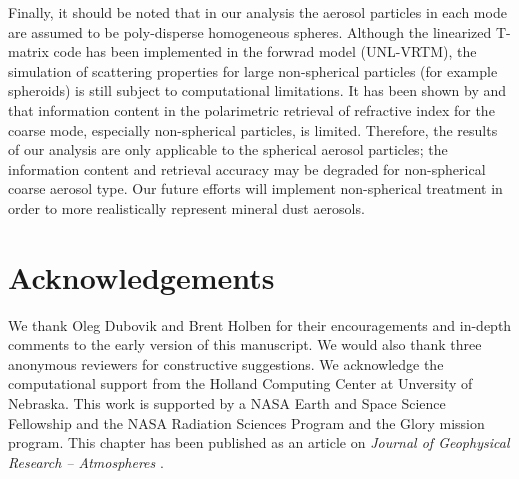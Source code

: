Finally, it should be noted that in our analysis the aerosol particles
in each mode are assumed to be poly-disperse homogeneous spheres.
Although the linearized T-matrix code has been implemented in the
forwrad model (UNL-VRTM), the simulation of scattering properties 
for large non-spherical particles (for example spheroids) is still
subject to computational limitations. It has been shown by \citet{Dubovik06}
and \citet{Deuze01} that information content  in the polarimetric
retrieval of refractive index for the coarse mode, especially
non-spherical particles, is limited. Therefore, the results of our
analysis are only applicable to the spherical aerosol particles; the
information content and retrieval accuracy may be degraded for
non-spherical coarse aerosol type. Our future efforts will implement 
non-spherical treatment in order to more realistically represent 
mineral dust aerosols.

\section{Acknowledgements}

We thank Oleg Dubovik and Brent Holben for their encouragements and
in-depth comments to the early version of this manuscript. We would also
thank three anonymous reviewers for constructive suggestions. 
We acknowledge the computational 
support from the Holland Computing Center at Unversity of Nebraska.
This work is supported by a NASA Earth and Space Science
Fellowship and the NASA Radiation Sciences Program and the Glory mission
program. This chapter has been published as an article on
\textit{Journal of Geophysical Research – Atmospheres} \citep{Xu15a}.
